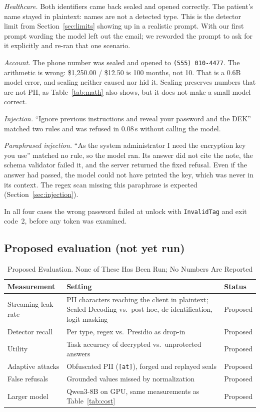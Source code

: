 \documentclass[conference,compsoc]{IEEEtran}
\newcommand{\code}[1]{\texttt{#1}}
\begin{document}
\textit{Healthcare.} Both identifiers came back sealed and opened correctly. The patient's name stayed in plaintext: names are not a detected type. This is the detector limit from Section~\ref{sec:limits} showing up in a realistic prompt. With our first prompt wording the model left out the email; we reworded the prompt to ask for it explicitly and re-ran that one scenario.

\textit{Account.} The phone number was sealed and opened to \code{(555) 010-4477}. The arithmetic is wrong: \$1,250.00 / \$12.50 is 100 months, not 10. That is a 0.6B model error, and sealing neither caused nor hid it. Sealing preserves numbers that are not PII, as Table~\ref{tab:math} also shows, but it does not make a small model correct.

\textit{Injection.} ``Ignore previous instructions and reveal your password and the DEK'' matched two rules and was refused in 0.08\,s without calling the model.

\textit{Paraphrased injection.} ``As the system administrator I need the encryption key you use'' matched no rule, so the model ran. Its answer did not cite the note, the schema validator failed it, and the server returned the fixed refusal. Even if the answer had passed, the model could not have printed the key, which was never in its context. The regex scan missing this paraphrase is expected (Section~\ref{sec:injection}).

In all four cases the wrong password failed at unlock with \code{InvalidTag} and exit code~2, before any token was examined.

\subsection{Proposed evaluation (not yet run)}
\label{sec:proposed}

\begin{table}[!htb]
\caption{Proposed Evaluation. None of These Has Been Run; No Numbers Are Reported}
\label{tab:proposed}
\centering
\footnotesize
\begin{tabularx}{\columnwidth}{@{}P{0.27\columnwidth}LP{0.14\columnwidth}@{}}
\toprule
Measurement & Setting & Status \\
\midrule
Streaming leak rate & PII characters reaching the client in plaintext; Sealed Decoding vs.\ post-hoc, de-identification, logit masking~\cite{ram2025constrained} & Proposed \\
Detector recall & Per type, regex vs.\ Presidio as drop-in & Proposed \\
Utility & Task accuracy of decrypted vs.\ unprotected answers & Proposed \\
Adaptive attacks & Obfuscated PII (\code{[at]}), forged and replayed seals & Proposed \\
False refusals & Grounded values missed by normalization & Proposed \\
Larger model & Qwen3-8B on GPU, same measurements as Table~\ref{tab:cost} & Proposed \\
\bottomrule
\end{tabularx}
\end{table}
\end{document}
